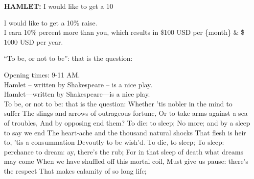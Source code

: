 \documentclass{article}
\begin{document}
\textbf{HAMLET:}
    I would like to get a 10%

    I would like to get a 10\% raise.\\

    I earn 10\% percent more than you,
    which results in \$100 USD per \{month\} \& \~ \$ 1000 USD per year.

    ``To be, or not to be'': that is the question:

    Opening times: 9-11 AM.\\%
    Hamlet -- written by Shakespeare -- is a nice play.\\%
    Hamlet---written by Shakespeare---is a nice play.\\%

    To be, or not to be: that is the question:
    Whether 'tis nobler in the mind to suffer
    The slings and arrows of outrageous fortune,
    Or to take arms against a sea of troubles,
    And by opposing end them? To die: to sleep;
    No more; and by a sleep to say we end
    The heart-ache and the thousand natural shocks
    That flesh is heir to, 'tis a consummation
    Devoutly to be wish'd. To die, to sleep;
    To sleep: perchance to dream: ay, there's the rub;
    For in that sleep of death what dreams may come
    When we have shuffled off this mortal coil,
    Must give us pause: there's the respect
    That makes calamity of so long life;
\end{document}
